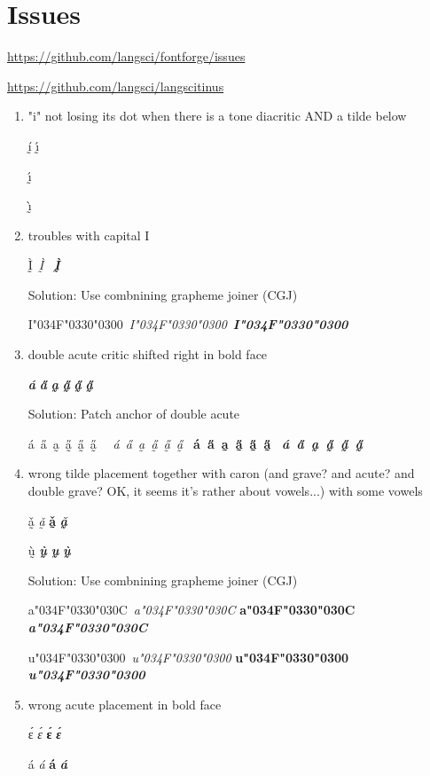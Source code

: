 \documentclass{article}
\newcommand{\ribbiline}[1]{#1\ 
	{\itshape #1}
	{\bfseries #1}
	{\itshape\bfseries #1}}
\newcommand{\ù}{{ṵ}\kern-2pt{̀}\kern2pt}
\newcommand{\Ǒ}{{{ɔ̌\kern-1pt\raisebox{-.5pt}{̰}\kern1pt}}}
\newcommand{\à}{{a̰}\kern-2pt{̀}\kern2pt}
\newcommand{\Itildegrave}{I\char"034F\char"0330\char"0300}
\newcommand{\atildecaron}{a\char"034F\char"0330\char"030C}
\newcommand{\utildegrave}{u\char"034F\char"0330\char"0300}
\begin{document}
\section*{Issues}

\url{https://github.com/langsci/fontforge/issues}

\url{https://github.com/langsci/langscitinus}


\begin{enumerate}
  \item  "i" not losing its dot when there is a tone diacritic AND a tilde below

   ḭ́
   ı̰́

   ı̰́

   ı̰̀

  \item troubles with capital I

Ḭ̀\
\textit{Ḭ̀} \
\textbf{\textit{Ḭ̀}}

Solution: Use combnining grapheme joiner (CGJ)

\Itildegrave\
\textit{\Itildegrave}\
\textbf{\textit{\Itildegrave}}

\item double acute critic shifted right in bold face

\textbf{\textit{á}}
\textbf{\textit{a̋}}
\textbf{\textit{a̰}}
\textbf{\textit{\H{a̰}}}
\textbf{\textit{a̰̋}}
\textbf{\textit{a̰̋}}

Solution: Patch anchor of double acute

{\LibertinusSerifPatch 
	\ribbiline{
		á\ 
		a̋\ 
		a̰\
		\H{a̰}\
		a̰̋\
		a̰̋\
	}
}

\item wrong tilde placement together with caron (and grave? and acute? and double grave? OK, it seems it's rather about vowels...) with some vowels

ǎ̰
\textit{ǎ̰}
\textbf{ǎ̰}
\textit{\textbf{ǎ̰}}

ṵ̀
\textbf{\textit{ṵ̀}}
\textbf{\textit{ṵ}}
\textbf{\textit{ṵ̀}}

Solution: Use combnining grapheme joiner (CGJ)

\ribbiline{\atildecaron}

\ribbiline{\utildegrave}


\item wrong acute placement in bold face

ɛ́
\textit{ɛ́}
\textbf{ɛ́}
\textit{\textbf{ɛ́}}

á
\textit{á}
\textbf{á}
\textit{\textbf{á}}


\end{enumerate}
\end{document}

